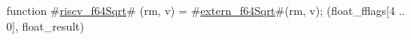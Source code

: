 function #\hyperref[sailRISCVzriscvzyf64Sqrt]{riscv\_f64Sqrt}# (rm, v) = {
  #\hyperref[sailRISCVzexternzyf64Sqrt]{extern\_f64Sqrt}#(rm, v);
  (float_fflags[4 .. 0], float_result)
}
